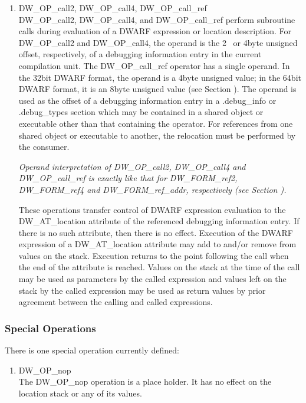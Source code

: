 \begin{enumerate}[1]
\item DW\-\_OP\-\_call2, DW\-\_OP\-\_call4, DW\-\_OP\-\_call\-\_ref \\
DW\-\_OP\-\_call2, DW\-\_OP\-\_call4, and DW\-\_OP\-\_call\-\_ref perform
subroutine calls during evaluation of a DWARF expression or
location description. 
For DW\-\_OP\-\_call2 and 
DW\-\_OP\-\_call4, 
the
operand is the 2\dash~ or 4\dash byte 
unsigned offset, respectively,
of a debugging information entry in the current compilation
unit. The DW\-\_OP\-\_call\-\_ref operator has a single operand. In the
32\dash bit DWARF format, the operand is a 4\dash byte unsigned value;
in the 64\dash bit DWARF format, it is an 8\dash byte unsigned value
(see Section ). 
The operand is used as the offset of a
debugging information entry in a .debug\_info or .debug\_types
section which may be contained in a shared object or executable
other than that containing the operator. For references from
one shared object or executable to another, the relocation
must be performed by the consumer.  

\textit{Operand interpretation of
DW\-\_OP\-\_call2, DW\-\_OP\-\_call4 and DW\-\_OP\-\_call\-\_ref is exactly like
that for DW\-\_FORM\-\_ref2, DW\-\_FORM\-\_ref4 and DW\-\_FORM\-\_ref\-\_addr,
respectively  
(see Section  ).  
}

These operations transfer
control of DWARF expression evaluation to the 
DW\-\_AT\-\_location
attribute of the referenced debugging information entry. If
there is no such attribute, then there is no effect. Execution
of the DWARF expression of a DW\-\_AT\-\_location attribute may add
to and/or remove from values on the stack. Execution returns
to the point following the call when the end of the attribute
is reached. Values on the stack at the time of the call may be
used as parameters by the called expression and values left on
the stack by the called expression may be used as return values
by prior agreement between the calling and called expressions.
\end{enumerate}


\subsubsection{Special Operations}
There is one special operation currently defined:
\begin{enumerate}[1]
\item DW\-\_OP\-\_nop \\
The DW\-\_OP\-\_nop operation is a place holder. It has no effect
on the location stack or any of its values.

\end{enumerate}
